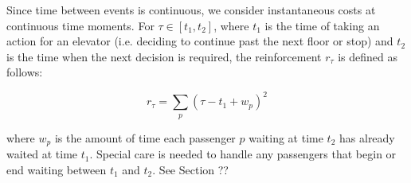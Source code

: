 Since time between events is continuous, we consider instantaneous costs at continuous time moments. For $\tau \in [t_1, t_2]$, where $t_1$ is the time of taking an action for an elevator (i.e. deciding to continue past the next floor or stop) and $t_2$ is the time when the next decision is required, the reinforcement $r_\tau$ is defined as follows:

\begin{equation}
    r_\tau = \sum_p (\tau - t_1 + w_p)^2
\end{equation}

where $w_p$ is the amount of time each passenger $p$ waiting at time $t_2$ has already waited at
time $t_1$. Special care is needed to handle any passengers that begin or end waiting between
$t_1$ and $t_2$. {\color{red} See Section ??}

